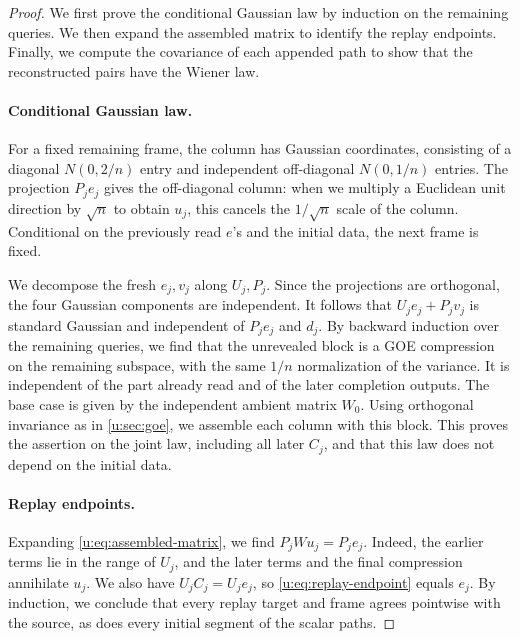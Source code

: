\begin{proof}
We first prove the conditional Gaussian law by induction on the
remaining queries. We then expand the assembled matrix to identify the
replay endpoints. Finally, we compute the covariance of each appended
path to show that the reconstructed pairs have the Wiener law.

\paragraph{Conditional Gaussian law.}
For a fixed remaining frame, the column has Gaussian coordinates,
consisting of a diagonal $N(0,2/n)$ entry and independent off-diagonal $N(0,1/n)$
entries. The projection $P_je_j$ gives the off-diagonal column:
when we multiply a Euclidean unit direction by $\sqrt n$ to obtain $u_j$,
this cancels the $1/\sqrt n$ scale of the column. Conditional on the previously
read $e$'s and the initial data, the next frame is fixed.

We decompose the fresh $e_j,v_j$ along $U_j,P_j$. Since the projections are orthogonal, the four Gaussian components
are independent. It follows that $U_je_j+P_jv_j$ is standard Gaussian and independent of $P_je_j$
and $d_j$. By backward induction over the remaining queries, we find that the
unrevealed block is a GOE compression on the remaining subspace, with
the same $1/n$ normalization of the variance. It is independent of the
part already read and of the later completion outputs. The base case is given by the independent
ambient matrix $W_0$. Using orthogonal invariance as in \cref{u:sec:goe}, we assemble
each column with this block. This proves the assertion on the joint law, including
all later $C_j$, and that this law does not depend on the initial data.

\paragraph{Replay endpoints.}
Expanding \eqref{u:eq:assembled-matrix}, we find
$P_jWu_j=P_je_j$. Indeed, the earlier terms lie in the range of $U_j$, and the later terms
and the final compression annihilate $u_j$. We also have
$U_jC_j=U_je_j$, so \eqref{u:eq:replay-endpoint} equals $e_j$.
By induction, we conclude that every replay target and frame agrees
pointwise with the source, as does every initial segment of the
scalar paths.


\end{proof}
